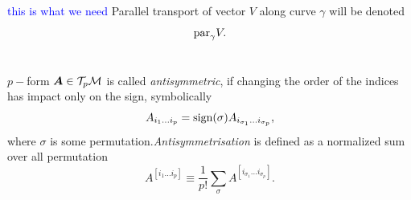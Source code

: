 



\section{}
\textcolor{blue}{this is what we need}
Parallel transport of vector $V$ along curve $\gamma$ will be denoted
$$\textrm{par}_\gamma V.$$



\section{}
$p-$form $\bm A\in \mathcal{T}_p \mathcal{M}$ is called \emph{antisymmetric}, if changing the order of the indices has impact only on the sign, symbolically
$$A_{i_1\dots i_p} = \operatorname{\textrm{sign}}(\sigma)A_{i_{\sigma_1}\dots i_{\sigma_p}},$$
where $\sigma$ is some permutation.\emph{Antisymmetrisation} is defined as a normalized sum over all permutation
\begin{equation}
    A^{[i_1\dots i_p]}\equiv \frac{1}{p!}\sum_\sigma A^{[i_{\sigma_1}\dots i_{\sigma_p}]}. 
\end{equation}

